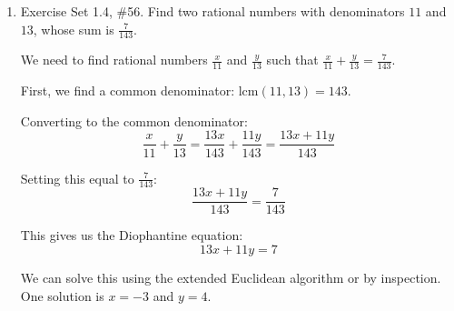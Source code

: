 \begin{enumerate}
\begin{subanswer}
    \textbf{Step 1:} $1155 = 2 \cdot 441 + 273$
    \textbf{Step 2:} $441 = 1 \cdot 273 + 168$
    \textbf{Step 3:} $273 = 1 \cdot 168 + 105$
    \textbf{Step 4:} $168 = 1 \cdot 105 + 63$
    \textbf{Step 5:} $105 = 1 \cdot 63 + 42$
    \textbf{Step 6:} $63 = 1 \cdot 42 + 21$
    \textbf{Step 7:} $42 = 2 \cdot 21 + 0$
    
    Since the remainder is $0$, we have $\gcd(441,1155) = 21$.
    
    Now we work backwards to express $21$ as a linear combination of $441$ and $1155$:
    
    From Step 6: $21 = 63 - 1 \cdot 42$
    From Step 5: $42 = 105 - 1 \cdot 63$, so $21 = 63 - 1 \cdot (105 - 1 \cdot 63) = 2 \cdot 63 - 1 \cdot 105$
    From Step 4: $63 = 168 - 1 \cdot 105$, so $21 = 2 \cdot (168 - 1 \cdot 105) - 1 \cdot 105 = 2 \cdot 168 - 3 \cdot 105$
    From Step 3: $105 = 273 - 1 \cdot 168$, so $21 = 2 \cdot 168 - 3 \cdot (273 - 1 \cdot 168) = 5 \cdot 168 - 3 \cdot 273$
    From Step 2: $168 = 441 - 1 \cdot 273$, so $21 = 5 \cdot (441 - 1 \cdot 273) - 3 \cdot 273 = 5 \cdot 441 - 8 \cdot 273$
    From Step 1: $273 = 1155 - 2 \cdot 441$, so $21 = 5 \cdot 441 - 8 \cdot (1155 - 2 \cdot 441) = 21 \cdot 441 - 8 \cdot 1155$
    
    Therefore, $\gcd(441,1155) = 21 = 21 \cdot 441 - 8 \cdot 1155$.
  \end{subanswer}

  \newpage

  \item Exercise Set 1.4, \#56. Find two rational numbers with denominators $11$ and $13$, whose sum is $\frac{7}{143}$.
  \begin{subanswer}
    We need to find rational numbers $\frac{x}{11}$ and $\frac{y}{13}$ such that $\frac{x}{11} + \frac{y}{13} = \frac{7}{143}$.
    
    First, we find a common denominator: $\text{lcm}(11,13) = 143$.
    
    Converting to the common denominator:
    \[
      \frac{x}{11} + \frac{y}{13} = \frac{13x}{143} + \frac{11y}{143} = \frac{13x + 11y}{143}
    \]
    
    Setting this equal to $\frac{7}{143}$:
    \[
      \frac{13x + 11y}{143} = \frac{7}{143}
    \]
    
    This gives us the Diophantine equation:
    \[
      13x + 11y = 7
    \]
    
    We can solve this using the extended Euclidean algorithm or by inspection. One solution is $x = -3$ and $y = 4$.
    

\end{subanswer}
\end{enumerate}
